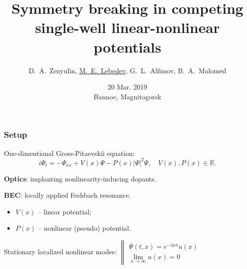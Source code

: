 \documentclass{beamer}
\begin{document}
\title{Symmetry breaking in competing single-well linear-nonlinear potentials}
\author{D.~A.~Zezyulin, \underline{M.~E.~Lebedev}, G.~L.~Alfimov, B.~A.~Malomed}
\date{20 Mar. 2019 \\ Bannoe, Magnitogorsk}


\begin{frame}
\maketitle
\end{frame}


\begin{frame}
\frametitle{Setup}
One-dimentional Gross-Pitaevskii equation:
$$i\Psi_t = -\Psi_{xx} + V(x) \Psi - P(x) |\Psi|^2 \Psi, \quad V(x), P(x) \in \mathbb{R}.$$

{\bf Optics}: implanting nonlinearity-inducing dopants\footnotemark[1].

{\bf BEC}: locally applied Feshbach resonance\footnotemark[2].

\begin{itemize}
\item $V(x)$ -- linear potential;
\item $P(x)$ -- nonlinear (pseudo) potential.
\end{itemize}

\medskip

Stationary localized nonlinear modes: $\left\| \begin{array}{l} \Psi(t, x) = e^{-i \mu x} u(x) \\ \lim \limits_{x \to \infty} u(x) = 0 \end{array}\right.$

\end{frame}
\end{document}
